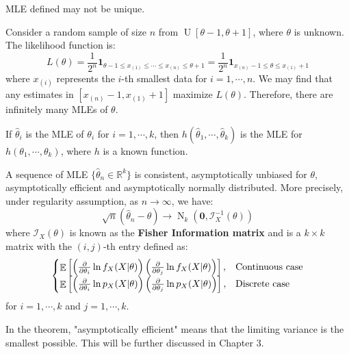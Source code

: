 \documentclass{huhtakm-template-book-v2}
\DeclareMathOperator{\E}{\mathbb{E}}
\DeclareMathOperator{\N}{N}
\DeclareMathOperator{\U}{U}
\begin{document}
\newpage
\begin{rem}
	MLE defined may not be unique.
\end{rem}
\begin{eg}
	Consider a random sample of size $n$ from $\U[\theta-1,\theta+1]$, where $\theta$ is unknown. The likelihood function is:
	\begin{equation*}
		L(\theta)=\frac{1}{2^{n}}\mathbf{1}_{\theta-1\leq x_{(1)}\leq\cdots\leq x_{(n)}\leq\theta+1}=\frac{1}{2^{n}}\mathbf{1}_{x_{(n)}-1\leq\theta\leq x_{(1)}+1}
	\end{equation*}
	where $x_{(i)}$ represents the $i$-th smallest data for $i=1,\cdots,n$. We may find that any estimates in $[x_{(n)}-1,x_{(1)}+1]$ maximize $L(\theta)$. Therefore, there are infinitely many MLEs of $\theta$.
\end{eg}
\begin{lem}
	If $\hat{\theta}_{i}$ is the MLE of $\theta_{i}$ for $i=1,\cdots,k$, then $h(\hat{\theta}_{1},\cdots,\hat{\theta}_{k})$ is the MLE for $h(\theta_{1},\cdots,\theta_{k})$, where $h$ is a known function.
\end{lem}
\begin{thm}
	\label{Chapter 2 (Thoerem) Sequence of MLE is asympt. normal}
	A sequence of MLE $\{\hat{\theta}_{n}\in\mathbb{R}^{k}\}$ is consistent, asymptotically unbiased for $\theta$, asymptotically efficient and asymptotically normally distributed. More precisely, under regularity assumption, as $n\to\infty$, we have:
	\begin{equation*}
		\sqrt{n}(\hat{\theta}_{n}-\theta)\to\N_{k}(\mathbf{0},\mathcal{I}_{X}^{-1}(\theta))
	\end{equation*}
	where $\mathcal{I}_{X}(\theta)$ is known as the \textbf{Fisher Information matrix} and is a $k\times k$ matrix with the $(i,j)$-th entry defined as:
	\begin{equation*}
		\begin{cases}
			\E\left[\left(\pdv*{\ln{f_{X}(X|\theta)}}{\theta_{i}}\right)\left(\pdv*{\ln{f_{X}(X|\theta)}}{\theta_{j}}\right)\right], &\text{Continuous case}\\
			\E\left[\left(\pdv*{\ln{p_{X}(X|\theta)}}{\theta_{i}}\right)\left(\pdv*{\ln{p_{X}(X|\theta)}}{\theta_{j}}\right)\right], &\text{Discrete case}
		\end{cases}
	\end{equation*}
	for $i=1,\cdots,k$ and $j=1,\cdots,k$.
\end{thm}
\begin{rem}
	In the theorem, "asymptotically efficient" means that the limiting variance is the smallest possible. This will be further discussed in Chapter 3.
\end{rem}
\end{document}
